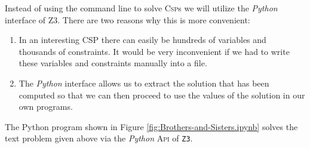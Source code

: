 \noindent
Instead of using the command line to solve \textsc{Csp}s we will utilize the \textsl{Python}
interface of Z3.  There are two reasons why this is more convenient:
\begin{enumerate}
\item In an interesting CSP there can easily be hundreds of variables and thousands of constraints.
      It would be very inconvenient if we had to write these variables and constraints manually into a file.
\item The \textsl{Python} interface allows us to extract the solution that has been computed so that we can
      then proceed to use the values of the solution in our own programs.
\end{enumerate}
The Python program shown in Figure \ref{fig:Brothers-and-Sisters.ipynb} solves
the text problem given above via the \textsl{Python} \textsc{Api} of \texttt{Z3}.
